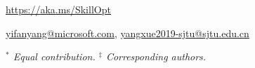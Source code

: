 \documentclass[11pt]{article}
\begin{document}
\vspace{0.45em}
\begin{msfttitlebox}
\setlength{\parindent}{0cm}
\setlength{\parskip}{0.14cm}
\raggedright
\nohyphens



\vspace{0.14cm}
{\setlength{\parskip}{0.06cm}\small
{\href{https://aka.ms/SkillOpt}{https://aka.ms/SkillOpt}\par}
{
\href{mailto:yifanyang@microsoft.com}{yifanyang@microsoft.com},
\href{mailto:yangxue2019-sjtu@sjtu.edu.cn}{yangxue2019-sjtu@sjtu.edu.cn}\par}
}
\vspace{0.08cm}
{\footnotesize\rmfamily\itshape\color{msftgray}
$^{*}$ Equal contribution. \quad $^{\ddagger}$ Corresponding authors.\par
}
\end{msfttitlebox}









% 
\FloatBarrier





\appendix

\end{document}
